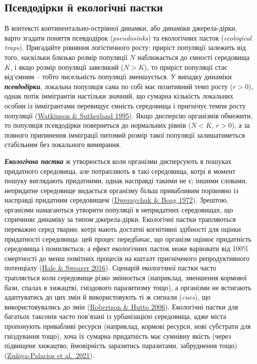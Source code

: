 \documentclass[
  11pt,
]{book}
\begin{document}
\subsection{Псевдодірки й екологічні пастки}\label{ux43fux441ux435ux432ux434ux43eux434ux456ux440ux43aux438-ux439-ux435ux43aux43eux43bux43eux433ux456ux447ux43dux456-ux43fux430ux441ux442ux43aux438}

В контексті континентально-острівної динамки, або динаміки джерела-дірки, варто згадати поняття псевдодірок (\emph{pseudosinks}) та екологічних пасток (\emph{ecological traps}). Пригадайте рівняння логістичного росту: приріст популяції залежить від того, наскільки близько розмір популяції \(N\) наближається до ємності середовища \(K\), і якщо розмір популяції завеликий (\(N > K\)), то приріст популяції стає від'ємним -- тобто чисельність популяції зменшується. У випадку динаміки \textbf{\emph{псевдодірки}}, локальна популяція сама по собі має позитивний темп росту (\(r > 0\)), однак потік іммігрантів настільки значний, що сумарна кількість локальних особин із іммігрантами перевищує ємність середовища і пригнічує темпи росту популяції (\href{https://doi.org/10.2307/5833}{Watkinson \& Sutherland 1995}). Якщо дисперсію організмів обмежити, то популяція псевдодірки повернеться до нормальних рівнів (\(N < K\), \(r > 0\)), а за повного припинення імміграції питомий розмір такої популяції залишатиметься стабільним без локального вимирання.

\textbf{\emph{Екологічна пастка}} ж утворюється коли організми дисперсують в пошуках придатного середовища, але потрапляють в такі середовища, котрі в момент пошуку виглядають придатними, однак насправді такими не є; іншими словами, непридатне середовище видається організму більш привабливим порівняно із насправді придатним середовищем (\href{https://doi.org/10.1139/z72-076}{Dwernychuk \& Boag 1972}). Зрештою, організми намагаються утворити популяції в непридатних середовищах, що спричиняє динаміку за типом джерела-дірки. Екологічні пастки трапляються переважно серед тварин, котрі мають достатні когнітивні здібності для оцінки придатності середовища: цей процес передбачає, що організм оцінює придатність середовища і помиляється; а ефект екологічних пасток може варіювати від 100\% смертності до менш помітних процесів на кшталт пригніченого репродуктивного потенціалу (\href{https://doi.org/10.1098/rspb.2015.2647}{Hale \& Swearer 2016}). Сценарій екологічної пастки часто трапляється коли середовище різко змінюється (наприклад, зменшення кормової бази, спалах в хижацтві, гніздового паразитизму тощо), а організми не встигають адаптуватись до цих змін й використовують ті ж сигнали (\emph{cues}), що використовувались до змін (\href{https://doi.org/10.1890/0012-9658(2006)87\%5B1075:AFFUET\%5D2.0.CO;2}{Robertson \& Hutto 2006}). Екологічні пастки для багатьох таксонів часто пов'язані із урбанізацією середовища, адже міста пропонують привабливі ресурси (наприклад, кормові ресурси, нові субстрати для гніздування тощо), хоча їх сумарна придатність має сумнівну якість (через підвищене хижацтво, ймовірність заразитись паразитами, забруднення тощо) (\href{https://doi.org/10.1016/j.scitotenv.2021.14655}{Zuñiga-Palacios et al.~2021}).
\end{document}
